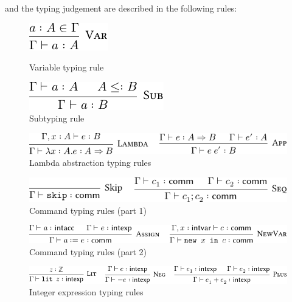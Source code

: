 \documentclass[12pt,a4paper]{report}
\theoremstyle{definition}
\begin{document}
        and the typing judgement are described in the following rules:
        \begin{figure}[H]
            \centering
            \begin{minipage}{0.4\textwidth}
                \centering
                \includegraphics{source_terms_var.pdf}
                \caption{Variable typing rule}
                \label{fig: rule_var}
            \end{minipage} \hspace{0.1\textwidth}
            \begin{minipage}{0.4\textwidth}
                \centering
                \includegraphics{source_terms_subtype.pdf}
                \caption{Subtyping rule}
                \label{fig: rule_subtype}
            \end{minipage}
        \end{figure}
        \begin{figure}[H]
            \centering
            \includegraphics{source_terms_lambda.pdf}
            \caption{Lambda abstraction typing rules}
            \label{fig: rule_lambda}
        \end{figure}
        \begin{figure}[H]
            \centering
            \includegraphics{source_terms_comm_1.pdf}
            \caption{Command typing rules (part 1)}
            \label{fig: rule_comm_1}
        \end{figure}
        \begin{figure}[H]
            \centering
            \includegraphics{source_terms_comm_2.pdf}
            \caption{Command typing rules (part 2)}
            \label{fig: rule_comm_2}
        \end{figure}
        \begin{figure}[H]
            \centering
            \includegraphics{source_terms_intexp.pdf}
            \caption{Integer expression typing rules}
            \label{fig: rule_intexp}
        \end{figure}
\end{document}
